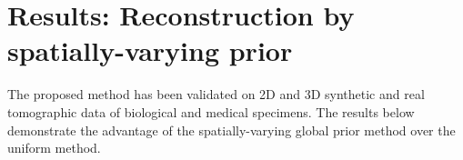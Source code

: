 \documentclass[journal]{IEEEtran}
\begin{document}
\section{Results: Reconstruction by spatially-varying prior}
\label{sec:results_spatially_varying_prior}

The proposed method has been validated on 2D and 3D synthetic and real
tomographic data of biological and medical specimens. The results
below demonstrate the advantage of the spatially-varying global prior
method over the uniform method.





\begin{figure}[!h]
\centering
{}\hfill
{}\hfill
{}\hfill

\end{figure}
\end{document}
